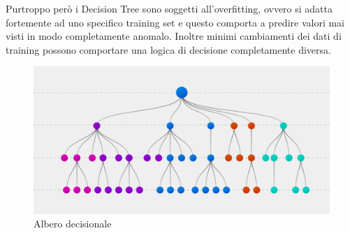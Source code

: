 \newline Purtroppo però i Decision Tree sono soggetti all'overfitting, ovvero si adatta fortemente ad uno specifico training set e questo comporta a predire valori mai visti in modo completamente anomalo. Inoltre minimi cambiamenti dei dati di training possono comportare una logica di decisione completamente diversa.
\begin{figure}[H]
    \centering
    \includegraphics[width=0.65\columnwidth]{figures/Decision-Trees.png}
    \caption{Albero decisionale}
    \label{fig:target}
\end{figure}